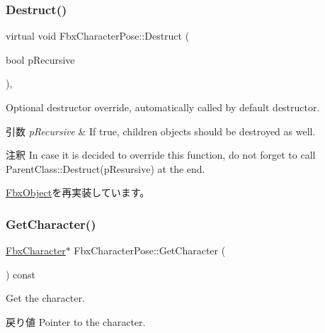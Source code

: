 \mbox{\label{class_fbx_character_pose_a81243ac4049bf44a94dcfee8639a03f0}} 
\subsubsection{\texorpdfstring{Destruct()}{Destruct()}}
{\footnotesize\ttfamily virtual void Fbx\+Character\+Pose\+::\+Destruct (\begin{DoxyParamCaption}\item[{bool}]{p\+Recursive }\end{DoxyParamCaption})\hspace{0.3cm}{\ttfamily [protected]}, {\ttfamily [virtual]}}

Optional destructor override, automatically called by default destructor. 
\begin{DoxyParams}{引数}
{\em p\+Recursive} & If true, children objects should be destroyed as well. \\
\hline
\end{DoxyParams}
\begin{DoxyRemark}{注釈}
In case it is decided to override this function, do not forget to call Parent\+Class\+::\+Destruct(p\+Resursive) at the end. 
\end{DoxyRemark}


\hyperlink{class_fbx_object_a123e084d9b32b29c28af6384b7c3c608}{Fbx\+Object}を再実装しています。

\mbox{\label{class_fbx_character_pose_ac0429f7f15902a3eeb0c50e890529cde}} 
\subsubsection{\texorpdfstring{Get\+Character()}{GetCharacter()}}
{\footnotesize\ttfamily \hyperlink{class_fbx_character}{Fbx\+Character}$\ast$ Fbx\+Character\+Pose\+::\+Get\+Character (\begin{DoxyParamCaption}{ }\end{DoxyParamCaption}) const}

Get the character. \begin{DoxyReturn}{戻り値}
Pointer to the character. 
\end{DoxyReturn}
\mbox{\label{class_fbx_character_pose_abe05a6239a8a3e436a3e4d28ccde5499}} 
